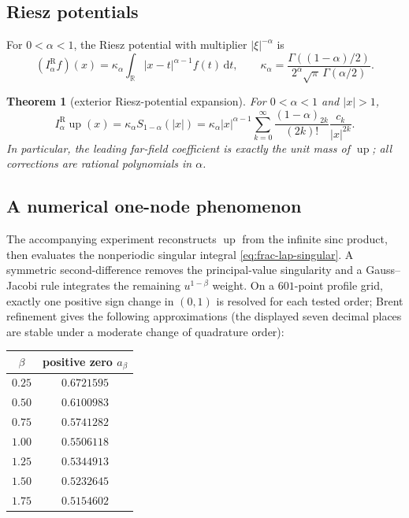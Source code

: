 \documentclass[11pt,oneside]{article}
\numberwithin{equation}{section}
\theoremstyle{plain}
\newtheorem{theorem}{Theorem}[section]
\theoremstyle{definition}
\theoremstyle{remark}
\newcommand{\R}{\mathbb R}
\newcommand{\Up}{\operatorname{up}}
\newcommand{\dd}{\,\mathrm d}
\begin{document}
\subsection{Riesz potentials}

For $0<\alpha<1$, the Riesz potential with multiplier $|\xi|^{-\alpha}$ is
\begin{equation}
 (I_\alpha^{\mathrm R}f)(x)
 =\kappa_\alpha\int_{\R}|x-t|^{\alpha-1}f(t)\dd t,
 \qquad
 \kappa_\alpha=
 \frac{\Gamma((1-\alpha)/2)}
      {2^\alpha\sqrt\pi\,\Gamma(\alpha/2)}.
 \label{eq:Riesz-potential}
\end{equation}

\begin{theorem}[exterior Riesz-potential expansion]
For $0<\alpha<1$ and $|x|>1$,
\begin{equation}
 I_\alpha^{\mathrm R}\Up(x)
 =\kappa_\alpha S_{1-\alpha}(|x|)
 =\kappa_\alpha|x|^{\alpha-1}
  \sum_{k=0}^{\infty}
   \frac{(1-\alpha)_{2k}}{(2k)!}
   \frac{c_k}{|x|^{2k}}.
 \label{eq:Riesz-potential-series}
\end{equation}
In particular, the leading far-field coefficient is exactly the unit mass of
$\Up$; all corrections are rational polynomials in $\alpha$.
\end{theorem}

\subsection{A numerical one-node phenomenon}

The accompanying experiment reconstructs $\Up$ from the infinite sinc product, then
evaluates the nonperiodic singular integral \cref{eq:frac-lap-singular}.  A
symmetric second-difference removes the principal-value singularity and a
Gauss--Jacobi rule integrates the remaining $u^{1-\beta}$ weight.  On a
$601$-point profile grid, exactly one positive sign change in $(0,1)$ is
resolved for each tested order; Brent refinement gives the following
approximations (the displayed seven decimal places are stable under a moderate
change of quadrature order):
\begin{center}
\begin{tabular}{@{}c@{\qquad}c@{}}
\toprule
$\beta$ & positive zero $a_\beta$\\
\midrule
$0.25$ & $0.6721595$\\
$0.50$ & $0.6100983$\\
$0.75$ & $0.5741282$\\
$1.00$ & $0.5506118$\\
$1.25$ & $0.5344913$\\
$1.50$ & $0.5232645$\\
$1.75$ & $0.5154602$\\
\bottomrule
\end{tabular}
\end{center}
\end{document}
